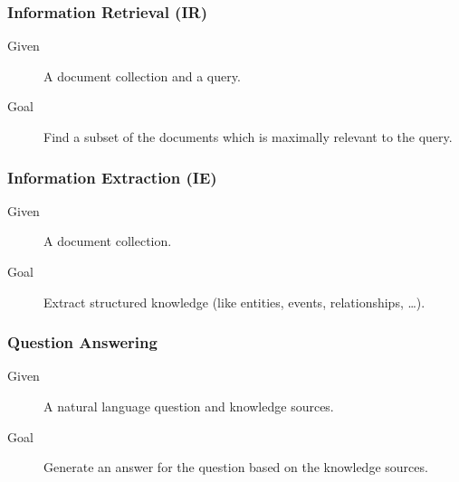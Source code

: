             \subsubsection{Information Retrieval (IR)} %
            	\begin{description}
            		\item[Given] A document collection and a query.
            		\item[Goal] Find a subset of the documents which is maximally relevant to the query.
            	\end{description}
            
            \subsubsection{Information Extraction (IE)} %
	            \begin{description}
	            	\item[Given] A document collection.
	            	\item[Goal] Extract structured knowledge (like entities, events, relationships, \dots).
	            \end{description}
            
            \subsubsection{Question Answering} %
	            \begin{description}
	            	\item[Given] A natural language question and knowledge sources.
	            	\item[Goal] Generate an answer for the question based on the knowledge sources.
	            \end{description}
            
